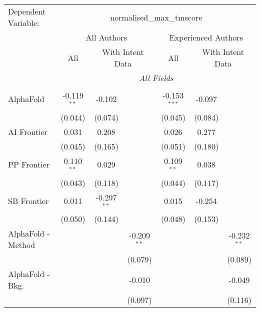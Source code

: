 \begingroup
\centering
\begin{tabular}{lcccccc}
   \tabularnewline \midrule \midrule
   Dependent Variable: & \multicolumn{6}{c}{normalised\_max\_tmscore}\\
 & \multicolumn{3}{c}{All Authors} & \multicolumn{3}{c}{Experienced Authors} \\
\cmidrule(lr){2-4} \cmidrule(lr){5-7}
 & \multicolumn{1}{c}{All} & \multicolumn{2}{c}{With Intent Data} & \multicolumn{1}{c}{All} & \multicolumn{2}{c}{With Intent Data} \\
\cmidrule(lr){2-2} \cmidrule(lr){3-4} \cmidrule(lr){5-5} \cmidrule(lr){6-7}
 & \multicolumn{6}{c}{\textit{All Fields}} \\ \\
   AlphaFold                     & -0.119$^{**}$ & -0.102        &                & -0.153$^{***}$ & -0.097  &   \\   
                                 & (0.044)       & (0.074)       &                & (0.045)        & (0.084) &   \\   
   AI Frontier                   & 0.031         & 0.208         &                & 0.026          & 0.277   &   \\   
                                 & (0.045)       & (0.165)       &                & (0.051)        & (0.180) &   \\   
   PP Frontier                   & 0.110$^{**}$  & 0.029         &                & 0.109$^{**}$   & 0.038   &   \\   
                                 & (0.043)       & (0.118)       &                & (0.044)        & (0.117) &   \\   
   SB Frontier                   & 0.011         & -0.297$^{**}$ &                & 0.015          & -0.254  &   \\   
                                 & (0.050)       & (0.144)       &                & (0.048)        & (0.153) &   \\   
   AlphaFold - Method            &               &               & -0.209$^{**}$  &                &         & -0.232$^{**}$\\   
                                 &               &               & (0.079)        &                &         & (0.089)\\   
   AlphaFold - Bkg.              &               &               & -0.010         &                &         & -0.049\\   
                                 &               &               & (0.097)        &                &         & (0.116)\\   

\end{tabular}
